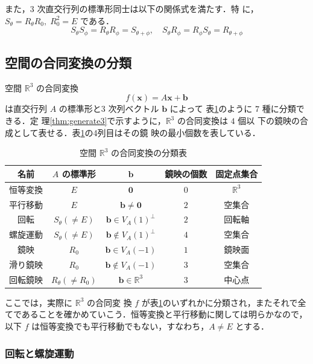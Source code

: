 \documentclass[11pt, uplatex, dvipdfmx, titlepage]{jsarticle}
\theoremstyle{definition}
\begin{document}
また，$3$ 次直交行列の標準形同士は以下の関係式を満たす．特
に，$S_{\theta}= R_{\theta}R_{0}, \; R_0^2=E$ である．
\[
  S_{\theta} S_{\phi} = R_{\theta}R_{\phi}=S_{\theta+\phi}, \quad  
  S_{\theta}R_{\phi} = R_{\phi}S_{\theta} = R_{\theta+\phi}
\]

\newpage

\subsection{空間の合同変換の分類}

空間 $\mathbb{R}^3$ の合同変換
\[
  f(\bm{x}) = A\bm{x} + \bm{b}
\]
は直交行列 $A$ の標準形と$3$ 次列ベクトル $\bm{b}$ によって
表\ref{tab:classification3}のように $7$ 種に分類できる．定
理\ref{thm:generate3}で示すように，$\mathbb{R}^3$ の合同変換は $4$ 個以
下の鏡映の合成として表せる．表\ref{tab:classification3}の4列目はその鏡
映の最小個数を表している．

\begin{table}[h]
  \centering
  \begin{tabular}[h]{|c|c|c|c|c|}\hline
    名前 & $A$ の標準形 & $\bm{b}$ & 鏡映の個数 & 固定点集合\\ \hline
    恒等変換 & $E$ & $\bm{0}$ & 0 & $\mathbb{R}^3$\\ 
    平行移動 & $E$ & $\bm{b} \neq \bm{0}$ & $2$ & 空集合\\
    回転 & $S_{\theta} (\neq E)$ & $\bm{b} \in V_{A}(1)^{\perp}$  & $2$ & 回転軸\\
    螺旋運動 & $S_{\theta} (\neq E)$ & $\bm{b} \notin V_{A}(1)^{\perp}$ & $4$ &  空集合\\ 
    鏡映 & $R_{0}$ & $\bm{b} \in V_A(-1)$ & $1$ & 鏡映面\\
    滑り鏡映 & $R_{0}$ & $\bm{b} \notin V_A(-1)$ & $3$ & 空集合\\
    回転鏡映 & $R_{\theta} (\neq R_{0})$ & $\bm{b} \in \mathbb{R}^3$ & $3$ &  中心点\\ \hline    
  \end{tabular}
  \caption{空間 $\mathbb{R}^3$ の合同変換の分類表}
  \label{tab:classification3}
\end{table}

ここでは，実際に $\mathbb{R}^3$ の合同変
換 $f$ が表\ref{tab:classification3}のいずれかに分類され，またそれで全
てであることを確かめていこう．恒等変換と平行移動に関しては明らかなので，
以下 $f$ は恒等変換でも平行移動でもない，すなわち，$A \neq E$ とする．


\subsubsection{回転と螺旋運動}\label{sec:RotSpiral3}
\end{document}
